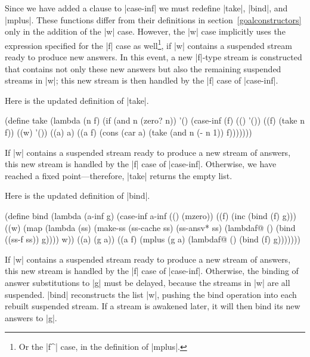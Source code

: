 
Since we have added a clause to \scheme|case-inf| we must redefine
\scheme|take|, \scheme|bind|, and \scheme|mplus|.  These functions
differ from their definitions in section~\ref{goalconstructors} only
in the addition of the \scheme|w| case.  However, the \scheme|w| case
implicitly uses the expression specified for the \scheme|f| case as
well\footnote{Or the \scheme|f^| case, in the definition of
  \scheme|mplus|.}, if \scheme|w| contains a suspended stream ready to
produce new answers.  In this event, a new \scheme|f|-type stream is
constructed that contains not only these new answers but also the
remaining suspended streams in \scheme|w|; this new stream is then
handled by the \scheme|f| case of \scheme|case-inf|.

\newpage

Here is the updated definition of \scheme|take|.

\schemedisplayspace
\begin{schemedisplay} 
(define take
  (lambda (n f)
    (if (and n (zero? n)) 
      '()
      (case-inf (f)
        (() '())
        ((f) (take n f))
        ((w) '())
        ((a) a)
        ((a f) (cons (car a) (take (and n (- n 1)) f)))))))
\end{schemedisplay}

\noindent 
If \scheme|w| contains a suspended stream ready to produce a new
stream of answers, this new stream is handled by the \scheme|f| case
of \scheme|case-inf|.  Otherwise, we have reached a fixed
point---therefore, \scheme|take| returns the empty list.

Here is the updated definition of \scheme|bind|.

\schemedisplayspace
\begin{schemedisplay} 
(define bind
  (lambda (a-inf g)
    (case-inf a-inf
      (() (mzero))
      ((f) (inc (bind (f) g)))
      ((w) (map (lambda (ss)
                  (make-ss (ss-cache ss) (ss-ansv* ss)
                           (lambdaf@ () (bind ((ss-f ss)) g))))
                w))
      ((a) (g a))
      ((a f) (mplus (g a) (lambdaf@ () (bind (f) g)))))))
\end{schemedisplay}

\noindent If \scheme|w| contains a suspended stream ready to produce a new
stream of answers, this new stream is handled by the \scheme|f| case
of \scheme|case-inf|.  Otherwise, the binding of answer substitutions
to \scheme|g| must be delayed, because the streams in \scheme|w| are
all suspended.  \scheme|bind| reconstructs the list \scheme|w|,
pushing the bind operation into each rebuilt suspended stream.  If a
stream is awakened later, it will then bind its new answers to
\scheme|g|.

